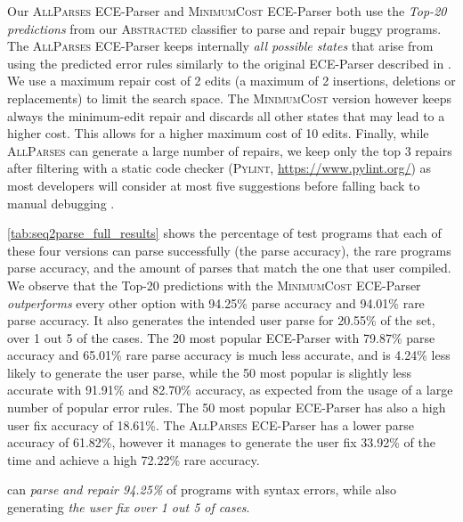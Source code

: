Our \textsc{AllParses} ECE-Parser and \textsc{MinimumCost} ECE-Parser both use
the \emph{Top-20 predictions} from our \textsc{Abstracted} classifier to parse
and repair buggy programs. The \textsc{AllParses} ECE-Parser keeps internally
\emph{all possible states} that arise from using the predicted error rules
similarly to the original ECE-Parser described in \citep{Aho_1972}. We use a
maximum repair cost of 2 edits (\ie a maximum of 2 insertions, deletions or
replacements) to limit the search space. The \textsc{MinimumCost} version
however keeps always the minimum-edit repair and discards all other states that
may lead to a higher cost. This allows for a higher maximum cost of 10 edits.
Finally, while \textsc{AllParses} can generate a large number of repairs, we
keep only the top 3 repairs after filtering with a static code checker
(\textsc{Pylint}, \url{https://www.pylint.org/}) as most developers will
consider at most five suggestions before falling back to manual debugging
\citep{Kochhar2016-oc, Parnin2011-ce}.

\autoref{tab:seq2parse_full_results} shows the percentage of test programs that
each of these four versions can parse successfully (\ie the parse accuracy), the
rare programs parse accuracy, and the amount of parses that match the one that
user compiled. We observe that the Top-20 predictions with the
\textsc{MinimumCost} ECE-Parser \emph{outperforms} every other option with
94.25\% parse accuracy and 94.01\% rare parse accuracy. It also
generates the intended user parse for 20.55\% of the set, \ie over 1 out 5 of the
cases. The 20 most popular ECE-Parser with 79.87\% parse accuracy and 65.01\%
rare parse accuracy is much less accurate, and is 4.24\% less likely to
generate the user parse, while the 50 most popular is slightly less accurate
with 91.91\% and 82.70\% accuracy, as expected from the usage of a large number
of popular error rules. The 50 most popular ECE-Parser has also a high user fix
accuracy of 18.61\%. The \textsc{AllParses} ECE-Parser has a lower parse
accuracy of 61.82\%, however it manages to generate the user fix
33.92\% of the time and achieve a high 72.22\% rare accuracy.

\begin{framed}
  \noindent \toolname can \emph{parse and repair 94.25\%} of programs with
  syntax errors, while also generating \emph{the user fix over 1 out 5 of
  cases}.
\end{framed}


